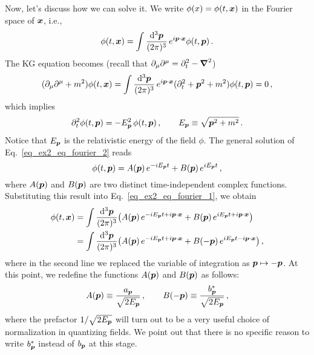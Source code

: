 \begin{sol}
	Now, let's discuss how we can solve it. 
	We write $\phi(x) = \phi(t,\boldsymbol{x})$ in the Fourier space of $\boldsymbol{x}$, i.e.,
	\begin{equation}
		\phi(t,\boldsymbol{x}) = \int \frac{{\rm d}^{3} \boldsymbol{p}}{(2\pi)^{3}} \, e^{i \boldsymbol{p} \cdot \boldsymbol{x}}\phi(t,\boldsymbol{p}) \,.
		\label{eq_ex2_eq_fourier_1}
	\end{equation}
	The KG equation becomes (recall that $\partial_\mu \partial^\mu = \partial_t^2 - \boldsymbol{\nabla}^2$)
	\begin{equation}
		(\partial_{\mu}\partial^{\mu} + m^{2} ) \phi(t,\boldsymbol{x})
		=
		\int \frac{{\rm d}^{3} \boldsymbol{p}}{(2\pi)^{3}} \, e^{i \boldsymbol{p} \cdot \boldsymbol{x}} (\partial_t^2 + \boldsymbol{p}^2 + m^2) \phi(t,\boldsymbol{p})
		=
		0 \,,
	\end{equation}
	which implies
	\begin{equation}
		\partial_t^2 \phi(t,\boldsymbol{p}) = - E_{\boldsymbol{p}}^2 \, \phi(t,\boldsymbol{p}) \,,
		\qquad
		E_{\boldsymbol{p}} \equiv \sqrt{\boldsymbol{p}^2 + m^2} \,. 
		\label{eq_ex2_eq_fourier_2}
	\end{equation}
	Notice that $E_{\boldsymbol{p}}$ is the relativistic energy of the field $\phi$. 
	The general solution of Eq.~\eqref{eq_ex2_eq_fourier_2} reads 
	\begin{equation}
		\phi(t,\boldsymbol{p}) = A(\boldsymbol{p}) \, e^{-i E_{\boldsymbol{p}} t} + B(\boldsymbol{p}) \, e^{i E_{\boldsymbol{p}} t} \,, 
		\label{eq_ex2_eq_fourier_3}
	\end{equation}
	where $A(\boldsymbol{p})$ and $B(\boldsymbol{p})$ are two distinct time-independent complex functions.
	Substituting this result into Eq.~\eqref{eq_ex2_eq_fourier_1}, we obtain
	\begin{equation}
		\begin{split}
			\phi(t,\boldsymbol{x}) & = \int \frac{{\rm d}^{3} \boldsymbol{p}}{(2\pi)^{3}} \big( A(\boldsymbol{p}) \, e^{-i E_{\boldsymbol{p}} t + i \boldsymbol{p} \cdot \boldsymbol{x}} + B(\boldsymbol{p}) \, e^{i E_{\boldsymbol{p}} t + i \boldsymbol{p} \cdot \boldsymbol{x}} \big)
			\\
			& = \int \frac{{\rm d}^{3} \boldsymbol{p}}{(2\pi)^{3}} \big( A(\boldsymbol{p}) \, e^{-i E_{\boldsymbol{p}} t + i \boldsymbol{p} \cdot \boldsymbol{x}} + B(-\boldsymbol{p}) \, e^{i E_{\boldsymbol{p}} t - i \boldsymbol{p} \cdot \boldsymbol{x}} \big) \,,
		\end{split}
	\end{equation}
	where in the second line we replaced the variable of integration as $\boldsymbol{p} \mapsto - \boldsymbol{p}$. 
	At this point, we redefine the functions $A(\boldsymbol{p})$ and $B(\boldsymbol{p})$ as follows:
	\begin{equation}
		A(\boldsymbol{p}) \equiv \frac{a_{\boldsymbol{p}}}{\sqrt{2E_{\boldsymbol{p}}}} \,,
		\qquad
		B(-\boldsymbol{p}) \equiv \frac{b_{\boldsymbol{p}}^*}{\sqrt{2E_{\boldsymbol{p}}}} \,,
	\end{equation}
	where the prefactor $1/\sqrt{2E_{\boldsymbol{p}}}$ will turn out to be a very useful choice of normalization in quantizing fields.    
	We point out that there is no specific reason to write $b_{\boldsymbol{p}}^*$ instead of $b_{\boldsymbol{p}}$ at this stage. 

\end{sol}
